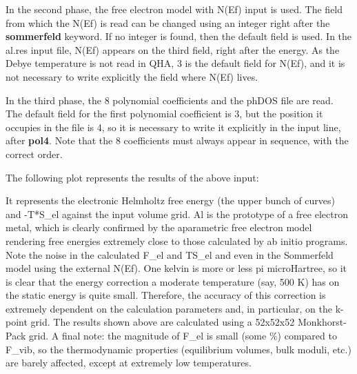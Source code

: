 \documentclass[a4paper]{article}
\begin{document}
In the second phase, the free electron model with N(Ef) input is
used. The field from which the N(Ef) is read can be changed using an
integer right after the \textbf{sommerfeld} keyword. If no integer is
found, then the default field is used. In the al.res input file, N(Ef)
appears on the third field, right after the energy. As the Debye
temperature is not read in QHA, 3 is the default field for N(Ef), and
it is not necessary to write explicitly the field where N(Ef) lives.

In the third phase, the 8 polynomial coefficients and the phDOS file
are read. The default field for the first polynomial coefficient is 3,
but the position it occupies in the file is 4, so it is necessary to
write it explicitly in the input line, after \textbf{pol4}. Note that the 8
coefficients must always appear in sequence, with the correct order.

The following plot represents the results of the above input:

\noindent{}

It represents the electronic Helmholtz free energy (the upper bunch of
curves) and -T*S\_el against the input volume grid. Al is the prototype
of a free electron metal, which is clearly confirmed by the
aparametric free electron model rendering free energies extremely
close to those calculated by ab initio programs. Note the noise in the
calculated F\_el and TS\_el and even in the Sommerfeld model using the
external N(Ef). One kelvin is more or less pi microHartree, so it is
clear that the energy correction a moderate temperature (say, 500 K)
has on the static energy is quite small. Therefore, the accuracy of
this correction is extremely dependent on the calculation parameters
and, in particular, on the k-point grid. The results shown above are
calculated using a 52x52x52 Monkhorst-Pack grid. A final note: the
magnitude of F\_el is small (some \%) compared to F\_vib, so the
thermodynamic properties (equilibrium volumes, bulk moduli, etc.) are
barely affected, except at extremely low temperatures.
\end{document}
